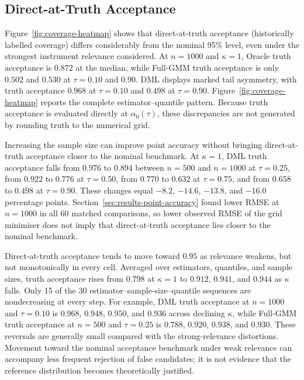\subsection{Direct-at-Truth Acceptance}
\label{sec:results-coverage}

Figure~\ref{fig:coverage-heatmap} shows that direct-at-truth acceptance (historically labelled coverage) differs considerably from the nominal 95\% level, even under the strongest instrument relevance considered. At $n=1000$ and $\kappa=1$, Oracle truth acceptance is $0.872$ at the median, while Full-GMM truth acceptance is only $0.502$ and $0.530$ at $\tau=0.10$ and $0.90$. DML displays marked tail asymmetry, with truth acceptance $0.968$ at $\tau=0.10$ and $0.498$ at $\tau=0.90$. Figure~\ref{fig:coverage-heatmap} reports the complete estimator--quantile pattern. Because truth acceptance is evaluated directly at $\alpha_0(\tau)$, these discrepancies are not generated by rounding truth to the numerical grid.



Increasing the sample size can improve point accuracy without bringing direct-at-truth acceptance closer to the nominal benchmark. At $\kappa=1$, DML truth acceptance falls from $0.976$ to $0.894$ between $n=500$ and $n=1000$ at $\tau=0.25$, from $0.922$ to $0.776$ at $\tau=0.50$, from $0.770$ to $0.632$ at $\tau=0.75$, and from $0.658$ to $0.498$ at $\tau=0.90$. These changes equal $-8.2$, $-14.6$, $-13.8$, and $-16.0$ percentage points. Section~\ref{sec:results-point-accuracy} found lower RMSE at $n=1000$ in all 60 matched comparisons, so lower observed RMSE of the grid minimiser does not imply that direct-at-truth acceptance lies closer to the nominal benchmark.

Direct-at-truth acceptance tends to move toward $0.95$ as relevance weakens, but not monotonically in every cell. Averaged over estimators, quantiles, and sample sizes, truth acceptance rises from $0.798$ at $\kappa=1$ to $0.912$, $0.941$, and $0.944$ as $\kappa$ falls. Only 15 of the 30 estimator--sample-size--quantile sequences are nondecreasing at every step. For example, DML truth acceptance at $n=1000$ and $\tau=0.10$ is $0.968$, $0.948$, $0.950$, and $0.936$ across declining $\kappa$, while Full-GMM truth acceptance at $n=500$ and $\tau=0.25$ is $0.788$, $0.920$, $0.938$, and $0.930$. These reversals are generally small compared with the strong-relevance distortions. Movement toward the nominal acceptance benchmark under weak relevance can accompany less frequent rejection of false candidates; it is not evidence that the reference distribution becomes theoretically justified.

